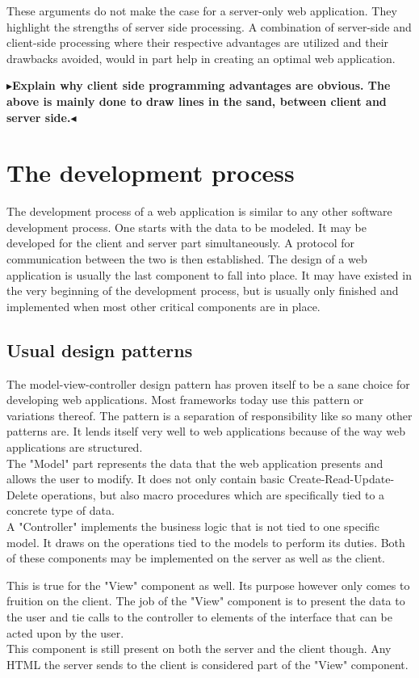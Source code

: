 \documentclass[twoside,11pt,openright]{report}
\newcommand{\todo}[1]{{\color[rgb]{.5,0,0}\textbf{$\blacktriangleright$#1$\blacktriangleleft$}}}
\begin{document}
These arguments do not make the case for a server-only web application.
They highlight the strengths of server side processing. A combination of
server-side and client-side processing where their respective advantages
are utilized and their drawbacks avoided, would in part help in creating
an optimal web application.

\todo{Explain why client side programming advantages are obvious.
The above is mainly done to draw lines in the sand, between client
and server side.}

\section{The development process}
The development process of a web application is similar to any other
software development process. One starts with the data to be modeled.
It may be developed for the client and server part simultaneously.
A protocol for communication between the two is then established.
The design of a web application is usually the last component to fall
into place. It may have existed in the very beginning of the development
process, but is usually only finished and implemented when most other critical
components are in place.

\subsection{Usual design patterns}
The model-view-controller design pattern has proven itself to be a sane
choice for developing web applications. Most frameworks today use this
pattern or variations thereof.
The pattern is a separation of responsibility like so many other patterns
are. It lends itself very well to web applications because of the way web
applications are structured.\\
The "Model" part represents the data that the web application presents and
allows the user to modify. It does not only contain basic
Create-Read-Update-Delete operations, but also macro procedures which are
specifically tied to a concrete type of data.\\
A "Controller" implements the business logic that is not tied to one specific
model. It draws on the operations tied to the models to perform its duties.
Both of these components may be implemented on the server as well as the
client.

This is true for the "View" component as well. Its purpose however only comes
to fruition on the client. The job of the "View" component is to present the
data to the user and tie calls to the controller to elements of the interface
that can be acted upon by the user.\\
This component is still present on both the server and the client though. Any
HTML the server sends to the client is considered part of the "View" component.
\end{document}
